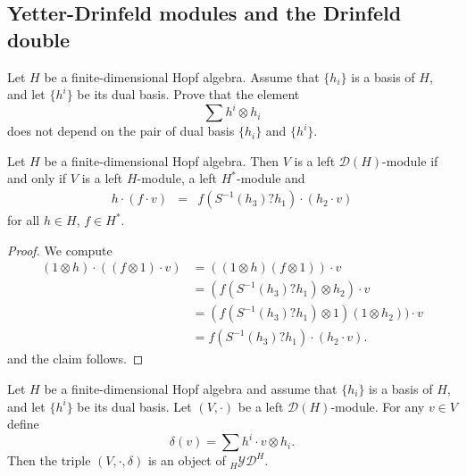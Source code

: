 \subsection{Yetter-Drinfeld modules and the Drinfeld double}

\begin{exercise}
Let $H$ be a finite-dimensional Hopf algebra. Assume that $\{h_i\}$ is a basis
of $H$, and let $\{h^i\}$ be its dual basis.  Prove that the element
\[
\sum h^i\otimes h_i
\]
does not depend on the pair of dual basis $\{h_i\}$ and $\{h^i\}$.
\end{exercise}

\begin{lemma}
\label{lem:DH_compatibility}
Let $H$ be a finite-dimensional Hopf algebra. Then  $V$ is a left
$\mathcal{D}(H)$-module if and only if $V$ is a left $H$-module, a left
$H^{*}$-module and 
\begin{eqnarray}
h\cdot(f\cdot v) & = & f(S^{-1}(h_{3})?h_{1})\cdot(h_{2}\cdot v)\label{eq:compatibility_D(H)}
\end{eqnarray}
for all $h\in H$, $f\in H^{*}$.
\end{lemma}

\begin{proof}
We compute 
\begin{align*}
(1\otimes h)\cdot((f\otimes1)\cdot v) & =((1\otimes h)(f\otimes1))\cdot v\\
 & =(f(S^{-1}(h_{3})?h_{1})\otimes h_{2})\cdot v\\
 & =(f(S^{-1}(h_{3})?h_{1})\otimes1)(1\otimes h_{2}))\cdot v\\
 & =f(S^{-1}(h_{3})?h_{1})\cdot(h_{2}\cdot v).
\end{align*}
and the claim follows. 
\end{proof}

\begin{lemma}
\label{lem:DH_to_YD}
Let $H$ be a finite-dimensional Hopf algebra and assume that $\{h_i\}$ is a basis
of $H$, and let $\{h^i\}$ be its dual basis.  
Let $(V,\cdot)$ be a left $\mathcal{D}(H)$-module. For any $v\in V$ define 
\[
\delta(v)=\sum h^i\cdot v\otimes h_i.
\]
Then the triple $(V,\cdot,\delta)$ is an object of $_H\mathcal{YD}^H$.
\end{lemma}

